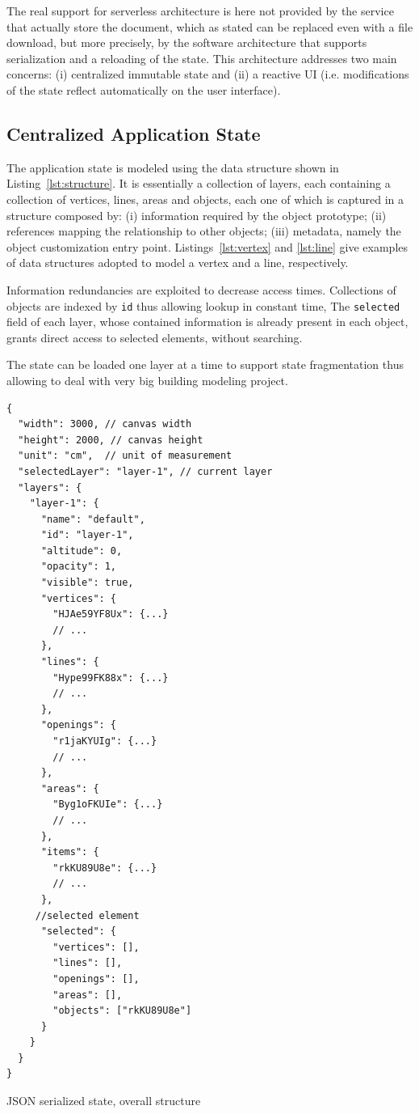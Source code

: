 The real support for serverless architecture is here not provided by the service that actually store the document, which as stated can be replaced even with a file download, but more precisely, by the software architecture that supports serialization and a reloading of the state. This architecture addresses two main concerns: (i) centralized immutable state and (ii) a reactive UI (i.e. modifications of the state reflect automatically on the user interface).

\subsection{Centralized Application State}\label{ssub:centr_state}

The application state is modeled using the data structure shown in Listing~\ref{lst:structure}. It is essentially a collection of layers, each containing a collection of vertices, lines, areas and objects, each one of which is captured in a structure composed by: (i) information required by the object prototype; (ii) references mapping the relationship to other objects; (iii) metadata, namely the object customization entry point. Listings~\ref{lst:vertex} and \ref{lst:line} give examples of data structures adopted to model a vertex and a line, respectively. 

Information redundancies are exploited to decrease access times. Collections of objects are indexed by \texttt{id} thus allowing lookup in constant time, The \texttt{selected} field of each layer, whose contained information is already present in each object,  grants direct access to selected elements, without searching.

The state can be loaded one layer at a time to support state fragmentation thus allowing to deal with very big building modeling project.

\begin{listing}
\begin{verbatim}
{
  "width": 3000, // canvas width
  "height": 2000, // canvas height
  "unit": "cm",  // unit of measurement
  "selectedLayer": "layer-1", // current layer
  "layers": {
    "layer-1": {
      "name": "default",
      "id": "layer-1",
      "altitude": 0,
      "opacity": 1,
      "visible": true,
      "vertices": {
        "HJAe59YF8Ux": {...}
        // ...
      },
      "lines": {
        "Hype99FK88x": {...}
        // ...
      },
      "openings": {
        "r1jaKYUIg": {...}
        // ...
      },
      "areas": {
        "Byg1oFKUIe": {...}
        // ...
      },
      "items": {
        "rkKU89U8e": {...}
        // ...
      },
     //selected element
      "selected": {
        "vertices": [],
        "lines": [],
        "openings": [],
        "areas": [],
        "objects": ["rkKU89U8e"]
      }
    }
  }
}
\end{verbatim}
\caption{JSON serialized state, overall structure} 
\label{lst:structure}
\end{listing}

